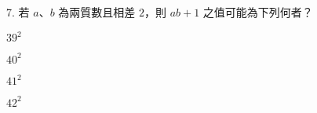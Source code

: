 \documentclass[12pt]{article}
\begin{document}
\begin{problem}
  \item[7.] 若 $a$、$b$ 為兩質數且相差 $2$，則 $ab + 1$ 之值可能為下列何者？
  \begin{choices}
    \item $39^2$
    \item $40^2$
    \item $41^2$
    \item $42^2$
  \end{choices}
\end{problem}
\end{document}
